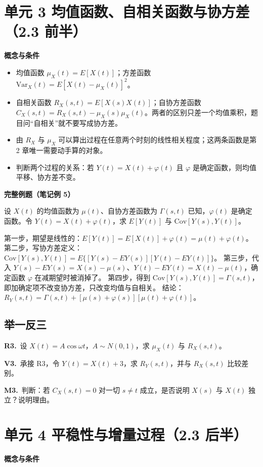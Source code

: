 \documentclass[UTF8,a4paper,11pt]{ctexart}
\newcommand{\PracticeQuestion}[3]{\par\Needspace{4\baselineskip}\noindent\begin{minipage}{\linewidth}\textbf{#1.}\ #2\par\noindent\rule{0pt}{#3mm}\par\end{minipage}\par}
\begin{document}
\section{单元 3 均值函数、自相关函数与协方差（2.3 前半）}
\textbf{概念与条件}

\begin{itemize}
\item 均值函数 $\mu_X(t)=E[X(t)]$；方差函数 $\mathrm{Var}_X(t)=E[X(t)-\mu_X(t)]^2$。
\item 自相关函数 $R_X(s,t)=E[X(s)X(t)]$；自协方差函数 $C_X(s,t)=R_X(s,t)-\mu_X(s)\mu_X(t)$。两者的区别只差一个均值乘积，题目问“自相关”就不要写成协方差。
\item 由 $R_X$ 与 $\mu_X$ 可以算出过程在任意两个时刻的线性相关程度；这两条函数是第 2 章唯一需要动手算的对象。
\item 判断两个过程的关系：若 $Y(t)=X(t)+\varphi(t)$ 且 $\varphi$ 是确定函数，则均值平移、协方差不变。
\end{itemize}
\textbf{完整例题（笔记例 5）}

设 $X(t)$ 的均值函数为 $\mu(t)$、自协方差函数为 $\Gamma(s,t)$ 已知，$\varphi(t)$ 是确定函数。令 $Y(t)=X(t)+\varphi(t)$，求 $E[Y(t)]$ 与 $\mathrm{Cov}[Y(s),Y(t)]$。

第一步，期望是线性的：$E[Y(t)]=E[X(t)]+\varphi(t)=\mu(t)+\varphi(t)$。 第二步，写协方差定义：$\mathrm{Cov}[Y(s),Y(t)]=E\{[Y(s)-E Y(s)][Y(t)-E Y(t)]\}$。 第三步，代入 $Y(s)-E Y(s)=X(s)-\mu(s)$、$Y(t)-E Y(t)=X(t)-\mu(t)$，确定函数 $\varphi$ 在减期望时被消掉了。 第四步，得到 $\mathrm{Cov}[Y(s),Y(t)]=\Gamma(s,t)$，即加确定项不改变协方差，只改变均值与自相关。 结论：$R_Y(s,t)=\Gamma(s,t)+[\mu(s)+\varphi(s)][\mu(t)+\varphi(t)]$。

\subsection{举一反三}
\PracticeQuestion{R3}{设 $X(t)=A\cos\omega t$，$A\sim N(0,1)$，求 $\mu_X(t)$ 与 $R_X(s,t)$。}{42}
\PracticeQuestion{V3}{承接 R3，令 $Y(t)=X(t)+3$，求 $R_Y(s,t)$，并与 $R_X(s,t)$ 比较差别。}{34}
\PracticeQuestion{M3}{判断：若 $C_X(s,t)=0$ 对一切 $s\ne t$ 成立，是否说明 $X(s)$ 与 $X(t)$ 独立？说明理由。}{34}
\clearpage
{}
\section{单元 4 平稳性与增量过程（2.3 后半）}
\textbf{概念与条件}
\end{document}
